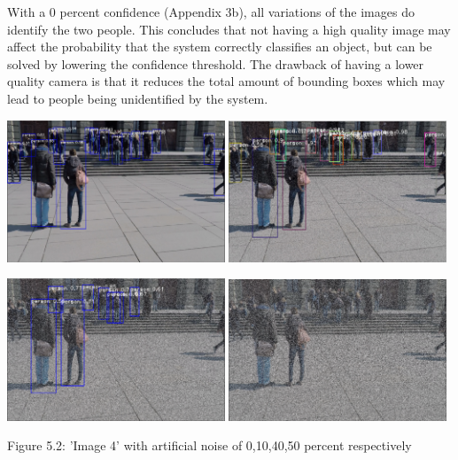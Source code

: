 \documentclass[12pt]{report}
\begin{document}
\vspace{2mm}

With a 0 percent confidence (Appendix 3b), all variations of the images do identify the two people. This concludes that not having a high quality image may affect the probability that the system correctly classifies an object, but can be solved by lowering the confidence threshold. The drawback of having a lower quality camera is that it reduces the total amount of bounding boxes which may lead to people being unidentified by the system.


\begin{center}
	\includegraphics[width=65mm]{./images/image45050.PNG}
	\includegraphics[width=65mm]{./images/appendix/imageAugment720pSandP.PNG}
	
	\vspace{2mm}
	\hspace{0.3mm}
	\includegraphics[width=65mm]{./images/appendix/imageAugment0.4SandP.PNG}
	\includegraphics[width=65mm]{./images/appendix/imageAugment0.5SandP.PNG}
	\vspace{3mm}
	
	{\footnotesize Figure 5.2: 'Image 4' with artificial noise of 0,10,40,50 percent respectively}
\end{center}
\end{document}
